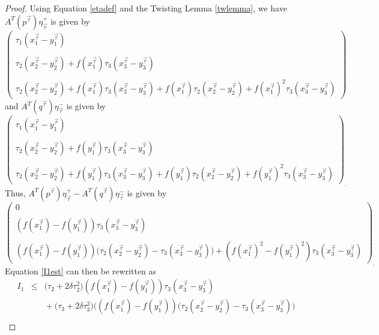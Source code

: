 \documentclass[reqno]{amsart}
\begin{document}
\begin{proof}
Using Equation \eqref{etadef} and the Twisting Lemma \ref{twlemma}, we have
$A^T(p^{\vec{\tau}})\eta^+_{\vec{\tau}} $ is given by 
\[
\begin{pmatrix}
\tau_1(x^{\vec{\tau}}_1-y^{\vec{\tau}}_1)\\
\mbox{} \\
\tau_2(x^{\vec{\tau}}_2-y^{\vec{\tau}}_2)+f(x_1^{\vec{\tau}})\tau_3(x^{\vec{\tau}}_3-y^{\vec{\tau}}_3)\\
\mbox{} \\
\tau_2(x^{\vec{\tau}}_2-y^{\vec{\tau}}_2)+f(x_1^{\vec{\tau}})\tau_3(x^{\vec{\tau}}_3-y^{\vec{\tau}}_3)+f(x_1^{\vec{\tau}})\tau_2(x^{\vec{\tau}}_2-y^{\vec{\tau}}_2)+f(x_1^{\vec{\tau}})^2\tau_3(x^{\vec{\tau}}_3-y^{\vec{\tau}}_3)
\end{pmatrix} 
\]
and $A^T(q^{\vec{\tau}})\eta^-_{\vec{\tau}}$ is given by
\[
\begin{pmatrix}
\tau_1(x^{\vec{\tau}}_1-y^{\vec{\tau}}_1)\\
\mbox{} \\
\tau_2(x^{\vec{\tau}}_2-y^{\vec{\tau}}_2)+f(y_1^{\vec{\tau}})\tau_3(x^{\vec{\tau}}_3-y^{\vec{\tau}}_3)\\
\mbox{} \\
\tau_2(x^{\vec{\tau}}_2-y^{\vec{\tau}}_2)+f(y_1^{\vec{\tau}})\tau_3(x^{\vec{\tau}}_3-y^{\vec{\tau}}_3)+f(y_1^{\vec{\tau}})\tau_2(x^{\vec{\tau}}_2-y^{\vec{\tau}}_2)+f(y_1^{\vec{\tau}})^2\tau_3(x^{\vec{\tau}}_3-y^{\vec{\tau}}_3)
\end{pmatrix}_.
\]
Thus, $A^T(p^{\vec{\tau}})\eta^+_{\vec{\tau}}-A^T(q^{\vec{\tau}})\eta^-_{\vec{\tau}}$ is given by
\[
\begin{pmatrix}
0\\
\mbox{} \\
(f(x_1^{\vec{\tau}})-f(y_1^{\vec{\tau}}))\tau_3(x^{\vec{\tau}}_3-y^{\vec{\tau}}_3)\\
\mbox{} \\
(f(x_1^{\vec{\tau}})-f(y_1^{\vec{\tau}}))\big(\tau_2(x^{\vec{\tau}}_2-y^{\vec{\tau}}_2)-\tau_3(x^{\vec{\tau}}_3-y^{\vec{\tau}}_3)\big)+(f(x_1^{\vec{\tau}})^2-f(y_1^{\vec{\tau}})^2)\tau_3(x^{\vec{\tau}}_3-y^{\vec{\tau}}_3)
\end{pmatrix}_.
\]
Equation \eqref{I1est} can then be rewritten as 
\begin{eqnarray*}
I_1 & \le & \big(\tau_2+2\delta\tau_2^2\big)(f(x_1^{\vec{\tau}})-f(y_1^{\vec{\tau}}))\tau_3(x^{\vec{\tau}}_3-y^{\vec{\tau}}_3) \\
 & & \mbox{}+\big(\tau_3+2\delta\tau_3^2\big)\Bigg((f(x_1^{\vec{\tau}})-f(y_1^{\vec{\tau}}))\big(\tau_2(x^{\vec{\tau}}_2-y^{\vec{\tau}}_2)-\tau_3(x^{\vec{\tau}}_3-y^{\vec{\tau}}_3)\big) \\

\end{eqnarray*}
\end{proof}
\end{document}
